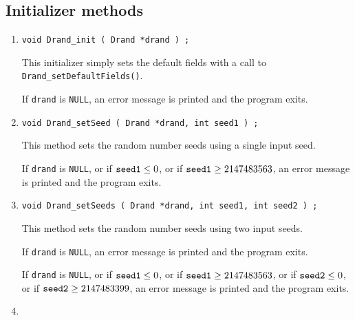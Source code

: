 \subsection{Initializer methods}
\label{subsection:Drand:proto:initializers}
\par
\begin{enumerate}
\item
\begin{verbatim}
void Drand_init ( Drand *drand ) ;
\end{verbatim}
This initializer simply sets the default fields with a call to
{\tt Drand\_setDefaultFields()}.
\par {}
If {\tt drand} is {\tt NULL},
an error message is printed and the program exits.
\item
\begin{verbatim}
void Drand_setSeed ( Drand *drand, int seed1 ) ;
\end{verbatim}
This method sets the random number seeds using a single input seed.
\par {}
If {\tt drand} is {\tt NULL},
or if ${\tt seed1} \le 0$,
or if ${\tt seed1} \ge 2147483563$,
an error message is printed and the program exits.
\item
\begin{verbatim}
void Drand_setSeeds ( Drand *drand, int seed1, int seed2 ) ;
\end{verbatim}
This method sets the random number seeds using two input seeds.
\par {}
If {\tt drand} is {\tt NULL},
an error message is printed and the program exits.
\par {}
If {\tt drand} is {\tt NULL},
or if ${\tt seed1} \le 0$,
or if ${\tt seed1} \ge 2147483563$,
or if ${\tt seed2} \le 0$,
or if ${\tt seed2} \ge 2147483399$,
an error message is printed and the program exits.
\item
\begin{verbatim}

\end{verbatim}
\end{enumerate}
